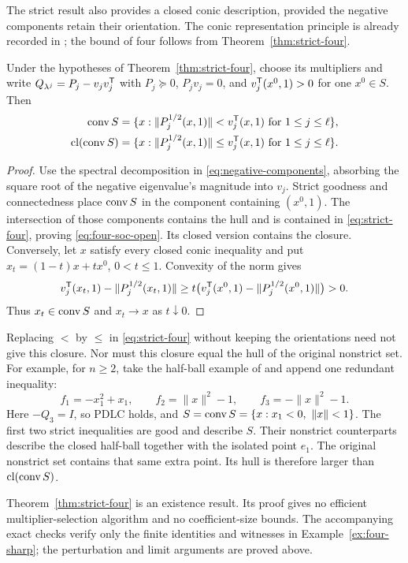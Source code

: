 The strict result also provides a closed conic description, provided the
negative components retain their orientation. The conic representation
principle is already recorded in \citet[Remark~2.19]{BDSpreprint};
the bound of four follows
from Theorem~\ref{thm:strict-four}.

\begin{corollary}
\label{cor:four-soc}
Under the hypotheses of Theorem~\ref{thm:strict-four}, choose its
multipliers and write $Q_{\lambda^j}=P_j-v_jv_j^{\mathsf T}$ with
$P_j\succeq0$, $P_jv_j=0$, and
$v_j^{\mathsf T}(x^0,1)>0$ for one $x^0\in S$. Then
\begin{align}
 \operatorname{conv} S&=\{x:\|P_j^{1/2}(x,1)\|<v_j^{\mathsf T}(x,1)
                    \text{ for }1\leq j\leq\ell\},\label{eq:four-soc-open}\\
 \operatorname{cl}(\operatorname{conv} S)&=\{x:\|P_j^{1/2}(x,1)\|\leq v_j^{\mathsf T}(x,1)
                    \text{ for }1\leq j\leq\ell\}.\label{eq:four-soc-closed}
\end{align}
\end{corollary}
\begin{proof}
Use the spectral decomposition in \eqref{eq:negative-components},
absorbing the square root of the negative eigenvalue's magnitude into
$v_j$. Strict goodness and connectedness place $\operatorname{conv} S$ in the
component containing $(x^0,1)$. The intersection of those components
contains the hull and is contained in \eqref{eq:strict-four}, proving
\eqref{eq:four-soc-open}. Its closed version contains the closure.
Conversely, let $x$ satisfy every closed conic inequality and put
$x_t=(1-t)x+tx^0$, $0<t\leq1$. Convexity of the norm gives
\[
 v_j^{\mathsf T}(x_t,1)-\|P_j^{1/2}(x_t,1)\|
 \geq t\bigl(v_j^{\mathsf T}(x^0,1)-\|P_j^{1/2}(x^0,1)\|\bigr)>0.
\]
Thus $x_t\in\operatorname{conv} S$ and $x_t\to x$ as $t\downarrow0$.
\end{proof}

Replacing $<$ by $\leq$ in \eqref{eq:strict-four} without keeping
the orientations need not give this closure. Nor must this closure
equal the hull of the original nonstrict set. For example, for $n\geq2$,
take the half-ball example of \citet[Example~2.23]{BDSpreprint} and
append one redundant inequality:
\[
 f_1=-x_1^2+x_1,\qquad f_2=\|x\|^2-1,\qquad
 f_3=-\|x\|^2-1.
\]
Here $-Q_3=I$, so PDLC holds, and
$S=\conv S=\{x:x_1<0,\ \|x\|<1\}$. The first two strict
inequalities are good and describe $S$. Their nonstrict counterparts
describe the closed half-ball together with the isolated point $e_1$.
The original nonstrict set contains that same extra point. Its hull is
therefore larger than $\operatorname{cl}(\operatorname{conv} S)$.

Theorem~\ref{thm:strict-four} is an existence result. Its proof gives
no efficient multiplier-selection algorithm and no coefficient-size
bounds. The accompanying exact checks verify only the finite identities
and witnesses in Example~\ref{ex:four-sharp}; the perturbation and limit
arguments are proved above.
